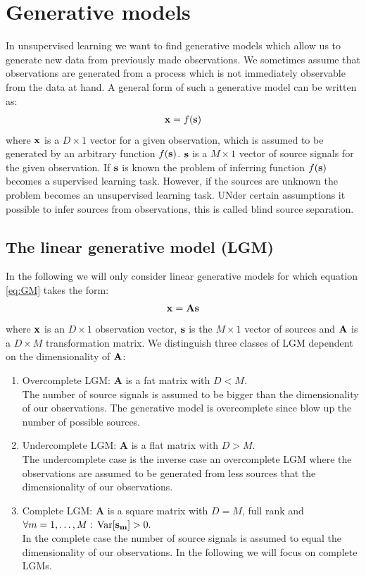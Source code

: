 \section{Generative models}
In unsupervised learning we want to find generative models which allow us to generate new data
from previously made observations. We sometimes assume that observations are generated from a 
process which is not immediately observable from the data at hand. A general form of such a 
generative model can be written as:
\begin{align}
	\mathbf{x} = f(\mathbf{s})
	\label{eq:GM}
\end{align}
where $\mathbf{x}$ is a $D \times 1$ vector for a given observation, which is assumed to be 
generated by an arbitrary function $f(\mathbf{s})$. $\mathbf{s}$ is a $M \times 1$ vector of
source signals for the given observation. If $\mathbf{s}$ is known the problem of inferring
function $f(\mathbf{s})$ becomes a supervised learning task. However, if the sources are 
unknown the problem becomes an unsupervised learning task. UNder certain assumptions
it possible to infer sources from observations, this is called blind source separation.

\subsection{The linear generative model (LGM)} 
In the following we will only consider linear generative models for which equation \eqref{eq:GM}
takes the form:
\begin{align}
	\mathbf{x} = \mathbf{A s}
	\label{eq:LGM}
\end{align}
where $\mathbf{x}$ is an $D \times 1$ observation vector, $\mathbf{s}$ is the $M \times 1$ vector
of sources and $\mathbf{A}$ is a $D \times M$ transformation matrix. 
We distinguish three classes of LGM dependent on the dimensionality of $\mathbf{A}$:

\begin{enumerate}
	\item Overcomplete LGM: \textbf{A} is a fat matrix with $D<M$. \\
		  The number of source signals is assumed to be bigger than the dimensionality 
		  of our observations. The generative model is overcomplete since blow up the number
		  of possible sources.
	\item Undercomplete LGM: \textbf{A} is a flat matrix with $D>M$. \\
	      The undercomplete case is the inverse case an overcomplete LGM where the observations
	      are assumed to be generated from less sources that the dimensionality of our observations.
	\item Complete LGM: \textbf{A} is a square matrix with $D=M$, full rank 
	      and $\forall m = 1,\dots,M: \, \mathrm{Var}[\mathbf{s_m}] > 0.$ \\
	      In the complete case the number of source signals is assumed to equal the dimensionality
	      of our observations. In the following we will focus on complete LGMs.    
\end{enumerate}

